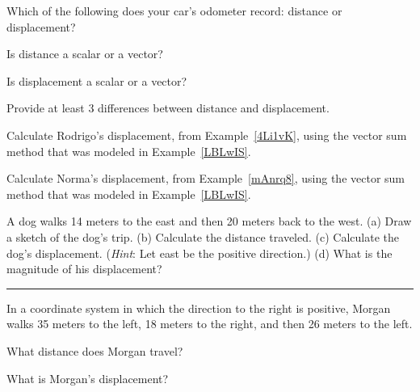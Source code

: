 \documentclass{article}
\begin{document}
\begin{exercise}
    Which of the following does your car's odometer record: distance or displacement?
\end{exercise}

\begin{exercise}
    Is distance a scalar or a vector?
\end{exercise}

\begin{exercise}
    Is displacement a scalar or a vector?
\end{exercise}

\begin{exercise}
    Provide at least 3 differences between distance and displacement.
\end{exercise}

\begin{exercise}
    Calculate Rodrigo's displacement, from Example~\ref{4Li1vK}, using the vector sum method that was modeled in Example~\ref{LBLwIS}.
\end{exercise}

\begin{exercise}
    Calculate Norma's displacement, from Example~\ref{mAnrq8}, using the vector sum method that was modeled in Example~\ref{LBLwIS}.
\end{exercise}

\begin{exercise} \label{xs4oMq}
A dog walks 14 meters to the east and then 20 meters back to the west.  (a) Draw a sketch of the dog's trip. (b) Calculate the distance traveled. (c) Calculate the dog's displacement. (\textit{Hint}: Let east be the positive direction.) (d) What is the magnitude of his displacement?
\end{exercise}


\hrule

\vspace{1em}

In a coordinate system in which the direction to the right is positive, Morgan walks 35 meters to the left, 18 meters to the right, and then 26 meters to the left.

\begin{exercise} \label{3rT1wE}
What distance does Morgan travel?
\end{exercise}

\begin{exercise} \label{0NkeX1}
What is Morgan's displacement?
\end{exercise}
\end{document}

